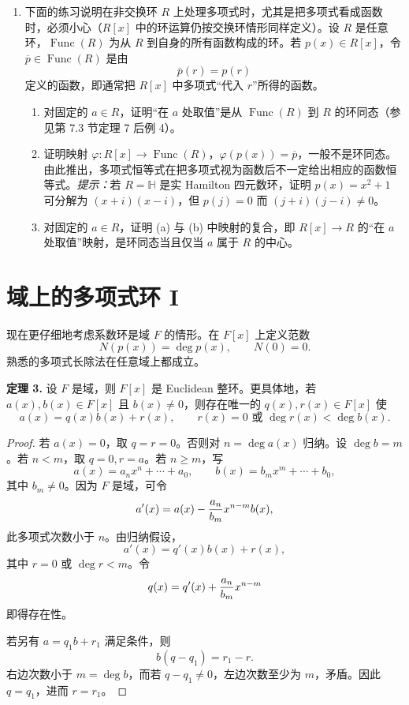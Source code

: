 \begin{enumerate}[label=\arabic*.]
	\item 下面的练习说明在非交换环 $R$ 上处理多项式时，尤其是把多项式看成函数时，必须小心（$R[x]$ 中的环运算仍按交换环情形同样定义）。设 $R$ 是任意环，$\operatorname{Func}(R)$ 为从 $R$ 到自身的所有函数构成的环。若 $p(x)\in R[x]$，令 $\overline p\in\operatorname{Func}(R)$ 是由
	\[
	\overline p(r)=p(r)
	\]
	定义的函数，即通常把 $R[x]$ 中多项式“代入 $r$”所得的函数。
	\begin{enumerate}[label=(\alph*)]
		\item 对固定的 $a\in R$，证明“在 $a$ 处取值”是从 $\operatorname{Func}(R)$ 到 $R$ 的环同态（参见第 7.3 节定理 7 后例 4）。
		\item 证明映射 $\varphi:R[x]\to\operatorname{Func}(R)$，$\varphi(p(x))=\overline p$，一般不是环同态。由此推出，多项式恒等式在把多项式视为函数后不一定给出相应的函数恒等式。\emph{提示：}若 $R=\mathbb H$ 是实 Hamilton 四元数环，证明 $p(x)=x^2+1$ 可分解为 $(x+i)(x-i)$，但 $p(j)=0$ 而 $(j+i)(j-i)\neq0$。
		\item 对固定的 $a\in R$，证明 (a) 与 (b) 中映射的复合，即 $R[x]\to R$ 的“在 $a$ 处取值”映射，是环同态当且仅当 $a$ 属于 $R$ 的中心。
	\end{enumerate}
\end{enumerate}

\section{域上的多项式环 I}

现在更仔细地考虑系数环是域 $F$ 的情形。在 $F[x]$ 上定义范数
\[
N(p(x))=\deg p(x),\qquad N(0)=0.
\]
熟悉的多项式长除法在任意域上都成立。

\noindent\textbf{定理 3.} 设 $F$ 是域，则 $F[x]$ 是 Euclidean 整环。更具体地，若 $a(x),b(x)\in F[x]$ 且 $b(x)\neq0$，则存在唯一的 $q(x),r(x)\in F[x]$ 使
\[
a(x)=q(x)b(x)+r(x),
\qquad r(x)=0\text{ 或 }\deg r(x)<\deg b(x).
\]

\begin{proof}
	若 $a(x)=0$，取 $q=r=0$。否则对 $n=\deg a(x)$ 归纳。设 $\deg b=m$。若 $n<m$，取 $q=0,r=a$。若 $n\geq m$，写
	\[
	a(x)=a_nx^n+\cdots+a_0,
	\qquad b(x)=b_mx^m+\cdots+b_0,
	\]
	其中 $b_m\neq0$。因为 $F$ 是域，可令
	\[
	a'(x)=a(x)-{a_n\over b_m}x^{n-m}b(x),
	\]
	此多项式次数小于 $n$。由归纳假设，
	\[
	a'(x)=q'(x)b(x)+r(x),
	\]
	其中 $r=0$ 或 $\deg r<m$。令
	\[
	q(x)=q'(x)+{a_n\over b_m}x^{n-m}
	\]
	即得存在性。
	
	若另有 $a=q_1b+r_1$ 满足条件，则
	\[
	b(q-q_1)=r_1-r.
	\]
	右边次数小于 $m=\deg b$，而若 $q-q_1\neq0$，左边次数至少为 $m$，矛盾。因此 $q=q_1$，进而 $r=r_1$。
\end{proof}


